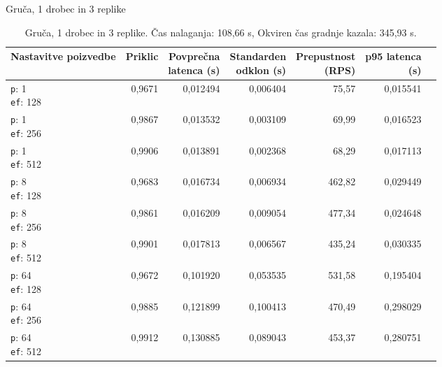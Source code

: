 \begin{table}[htbp]
  \centering
\small
  \caption{Gruča, 1 drobec in 3 replike}
  \label{tab:cluster-2cpu-4ram:tenant:s1-r3:qdrant-dipl-sharding-1-shard-3-replica-tenant-m-16-ef-128-random-768-100-tenants-extended-upload-2026-08-17-16-45-34.json}
  \begin{tabularx}{\textwidth}{Xrrrrrr}
    \toprule
    Nastavitve poizvedbe & Priklic & \makecell{Povprečna\\latenca (s)} & \makecell{Standarden\\odklon (s)} & \makecell{Prepustnost\\(RPS)} & \makecell{p95 latenca\\(s)}  \\
    \midrule
    \makecell{\texttt{p}: 1\\\texttt{ef}: 128} & 0,9671 & 0,012494 & 0,006404 & 75,57 & 0,015541 \\
    \makecell{\texttt{p}: 1\\\texttt{ef}: 256} & 0,9867 & 0,013532 & 0,003109 & 69,99 & 0,016523 \\
    \makecell{\texttt{p}: 1\\\texttt{ef}: 512} & 0,9906 & 0,013891 & 0,002368 & 68,29 & 0,017113 \\
    \makecell{\texttt{p}: 8\\\texttt{ef}: 128} & 0,9683 & 0,016734 & 0,006934 & 462,82 & 0,029449 \\
    \makecell{\texttt{p}: 8\\\texttt{ef}: 256} & 0,9861 & 0,016209 & 0,009054 & 477,34 & 0,024648 \\
    \makecell{\texttt{p}: 8\\\texttt{ef}: 512} & 0,9901 & 0,017813 & 0,006567 & 435,24 & 0,030335 \\
    \makecell{\texttt{p}: 64\\\texttt{ef}: 128} & 0,9672 & 0,101920 & 0,053535 & 531,58 & 0,195404 \\
    \makecell{\texttt{p}: 64\\\texttt{ef}: 256} & 0,9885 & 0,121899 & 0,100413 & 470,49 & 0,298029 \\
    \makecell{\texttt{p}: 64\\\texttt{ef}: 512} & 0,9912 & 0,130885 & 0,089043 & 453,37 & 0,280751 \\
    \bottomrule
  \end{tabularx}
\caption* {Gruča, 1 drobec in 3 replike. Čas nalaganja: 108,66 s, Okviren čas gradnje kazala: 345,93 s.}\end{table}

